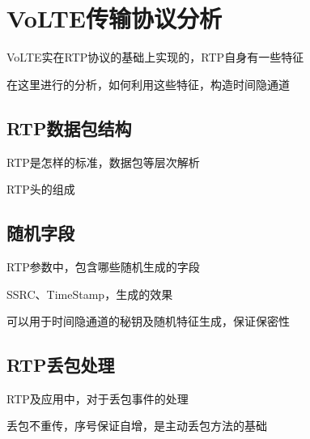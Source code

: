 \section{VoLTE传输协议分析}
\label{chap:backinfo:rtp}

VoLTE实在RTP协议的基础上实现的，RTP自身有一些特征

在这里进行的分析，如何利用这些特征，构造时间隐通道

\subsection{RTP数据包结构}
\label{chap:backinfo:rtp:struct}

RTP是怎样的标准，数据包等层次解析

RTP头的组成

\subsection{随机字段}
\label{chap:backinfo:random}

RTP参数中，包含哪些随机生成的字段

SSRC、TimeStamp，生成的效果

可以用于时间隐通道的秘钥及随机特征生成，保证保密性

\subsection{RTP丢包处理}
\label{chap:backinfo:dropout}

RTP及应用中，对于丢包事件的处理

丢包不重传，序号保证自增，是主动丢包方法的基础
